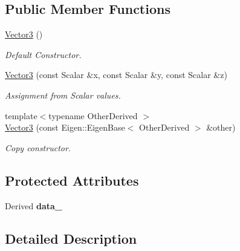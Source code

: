 \subsection*{Public Member Functions}
\begin{DoxyCompactItemize}
\item 
\hyperlink{classow__core_1_1Vector3_ae2c63c465a844cf260607beed2851620}{Vector3} ()\hypertarget{classow__core_1_1Vector3_ae2c63c465a844cf260607beed2851620}{}\label{classow__core_1_1Vector3_ae2c63c465a844cf260607beed2851620}

\begin{DoxyCompactList}\small\item\em Default Constructor. \end{DoxyCompactList}\item 
\hyperlink{classow__core_1_1Vector3_ab4e68ba3b96f153fe14408823a600332}{Vector3} (const Scalar \&x, const Scalar \&y, const Scalar \&z)\hypertarget{classow__core_1_1Vector3_ab4e68ba3b96f153fe14408823a600332}{}\label{classow__core_1_1Vector3_ab4e68ba3b96f153fe14408823a600332}

\begin{DoxyCompactList}\small\item\em Assignment from Scalar values. \end{DoxyCompactList}\item 
{\footnotesize template$<$typename Other\+Derived $>$ }\\\hyperlink{classow__core_1_1Vector3_ac80729ad78e79dff06e14d95b372945a}{Vector3} (const Eigen\+::\+Eigen\+Base$<$ Other\+Derived $>$ \&other)
\begin{DoxyCompactList}\small\item\em Copy constructor. \end{DoxyCompactList}\end{DoxyCompactItemize}
\subsection*{Protected Attributes}
\begin{DoxyCompactItemize}
\item 
Derived {\bfseries data\+\_\+}\hypertarget{classow__core_1_1Vector3_a1f3977149a1a461518a47bc68b831c6e}{}\label{classow__core_1_1Vector3_a1f3977149a1a461518a47bc68b831c6e}

\end{DoxyCompactItemize}


\subsection{Detailed Description}
